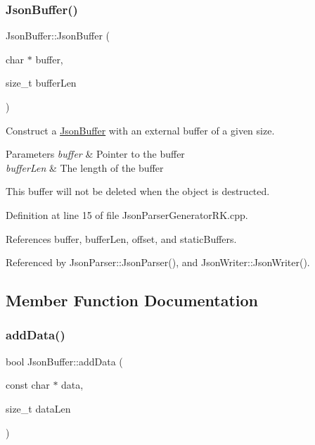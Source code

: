 \subsubsection{\texorpdfstring{Json\+Buffer()}{JsonBuffer()}\hspace{0.1cm}{\footnotesize\ttfamily [2/2]}}
{\footnotesize\ttfamily Json\+Buffer\+::\+Json\+Buffer (\begin{DoxyParamCaption}\item[{char $\ast$}]{buffer,  }\item[{size\+\_\+t}]{buffer\+Len }\end{DoxyParamCaption})}



Construct a \hyperlink{class_json_buffer}{Json\+Buffer} with an external buffer of a given size. 


\begin{DoxyParams}{Parameters}
{\em buffer} & Pointer to the buffer\\
\hline
{\em buffer\+Len} & The length of the buffer\\
\hline
\end{DoxyParams}
This buffer will not be deleted when the object is destructed. 

Definition at line 15 of file Json\+Parser\+Generator\+R\+K.\+cpp.



References buffer, buffer\+Len, offset, and static\+Buffers.



Referenced by Json\+Parser\+::\+Json\+Parser(), and Json\+Writer\+::\+Json\+Writer().



\subsection{Member Function Documentation}
\mbox{\label{class_json_buffer_a760cb5be42ed2d2ca9306b1109e76af3}} 
\subsubsection{\texorpdfstring{add\+Data()}{addData()}}
{\footnotesize\ttfamily bool Json\+Buffer\+::add\+Data (\begin{DoxyParamCaption}\item[{const char $\ast$}]{data,  }\item[{size\+\_\+t}]{data\+Len }\end{DoxyParamCaption})}



